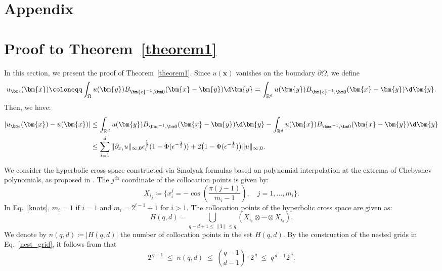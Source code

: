 \appendix
\section*{Appendix}
\section{Proof to Theorem~\ref{theorem1}}
\label{proof_theorem1}
In this section, we present the proof of Theorem~\ref{theorem1}. Since $u(\bm{x})$ vanishes on the boundary $\partial \Omega$, we define
\begin{equation}
    u_{\bm\epsilon}(\bm{x})\coloneqq \int_{\Omega}u(\bm{y})B_{\bm{\epsilon}^{-1}, \bm0}(\bm{x}-\bm{y})\d\bm{y}=\int_{\mathbb{R}^d}u(\bm{y})B_{\bm{\epsilon}^{-1}, \bm 0}(\bm{x}-\bm{y})\d\bm{y}.
\end{equation}
Then, we have:
\begin{equation}
\begin{aligned}
        |u_{\bm\epsilon}(\bm{x}) - u(\bm{x})| &\leq \int_{\mathbb{R}^d}u(\bm{y})B_{{\bm \epsilon}^{-1}, \bm0}(\bm{x}-\bm{y})\d\bm{y}-\int_{\mathbb{R}^d}u(\bm{x})B_{{\bm \epsilon}^{-1}, \bm0}(\bm{x}-\bm{y})\d\bm{y}\\
        &\leq \sum_{i=1}^d\|\partial_{x_i}u\|_{\infty, 0}\epsilon_i^{\frac{1}{2}} (1-\Phi(\epsilon^{-\frac{1}{2}})) + 2\big(1 - \Phi(\epsilon^{-\frac{1}{2}})\big)\|u\|_{\infty, 0}.
        \end{aligned}
        \label{rbf_error}
\end{equation} 

We consider the hyperbolic cross space constructed via Smolyak formulas based on polynomial interpolation at the extrema of Chebyshev polynomials, as proposed in \cite{barthelmann2000high}. The $j^{\text{th}}$ coordinate of the collocation points is given by:
\begin{equation}
    X_{i_j}\coloneqq \Big\{x_i^j=-\cos\left( \frac{\pi (j - 1)}{m_i - 1} \right), \quad j = 1, \ldots, m_i\Big\}.
\label{knots}
\end{equation}
In Eq.~\eqref{knots}, $m_i=1$ if $i=1$ and $m_i=2^{i-1}+1$ for $i>1$. The collocation points of the hyperbolic cross space are given as:
\begin{equation}
    H(q, d) = \bigcup_{q-d+1 \leq \|\mathbf{i}\| \leq q} (X_{i_1} \otimes \cdots \otimes X_{i_d}).
    \label{nest_grid}
\end{equation}
We denote by $n(q,d) \coloneqq |H(q,d)|$ the number of collocation points in the set $H(q,d)$. By the construction of the nested grids in Eq.~\eqref{nest_grid}, it follows from \cite{novak1999simple} that
\begin{equation}
2^{\,q-1} \;\le\; n(q,d) \;\le\; \binom{q-1}{d-1} \cdot2^{\,q}
\;\le\; q^{\,d-1} 2^{\,q}.
\end{equation}


